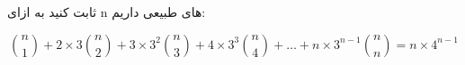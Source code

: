 \p    
ثابت کنید به ازای
 n
 ‌‌‌های
 ‌طبیعی داریم:

 \[
   \binom{n}{1} + 2\times3\binom{n}{2} + 3\times3^2\binom{n}{3} + 4\times3^3\binom{n}{4} +\ldots +
    n\times3^{n-1}\binom{n}{n} = n\times4^{n-1}
\]

